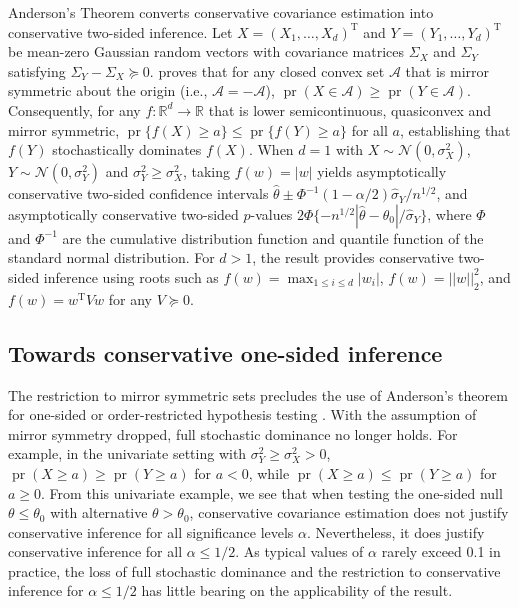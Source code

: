 \documentclass[11pt]{article}
\def\T{{ \mathrm{\scriptscriptstyle T} }}
\newcommand{\1}{\mathbbm{1}}
\def\pr{{\operatorname{pr}}}
\theoremstyle{plain}
\theoremstyle{definition}
\begin{document}
Anderson's Theorem \citep{and55} converts conservative covariance estimation into conservative two-sided inference. Let $X = (X_1,\ldots,X_d)^\T$ and $Y = (Y_1,\ldots,Y_d)^\T$ be mean-zero Gaussian random vectors with covariance matrices $\Sigma_X$ and $\Sigma_Y$ satisfying $\Sigma_Y-\Sigma_X \succeq 0$. \citet{and55} proves that for any closed convex set $\mathcal{A}$ that is mirror symmetric about the origin (i.e., $\mathcal{A}=-\mathcal{A}$), $\pr(X\in \mathcal{A})\geq \pr(Y\in \mathcal{A}).$ Consequently, for any $f: \mathbb{R}^d\rightarrow \mathbb{R}$ that is lower semicontinuous, quasiconvex and mirror symmetric, $\pr\{f(X)\geq a\} \leq \pr\{f(Y)\geq a\}$ for all $a$, establishing that $f(Y)$ stochastically dominates $f(X)$. When $d=1$ with $X\sim \mathcal{N}(0,\sigma^2_X)$, $Y\sim \mathcal{N}(0,\sigma^2_Y)$ and $\sigma^2_Y\geq \sigma^2_X$, taking $f(w) = |w|$ yields asymptotically conservative two-sided confidence intervals $\hat{\theta} \pm \Phi^{-1}(1-\alpha/2)\hat{\sigma}_Y/n^{1/2}$, and asymptotically conservative two-sided $p$-values $2\Phi\{-n^{1/2}|\hat{\theta}-\theta_0|/\hat{\sigma}_Y\}$, where $\Phi$ and $\Phi^{-1}$ are the cumulative distribution function and quantile function of the standard normal distribution. For $d > 1$, the result provides conservative two-sided inference using roots such as $f(w) = \max_{1\leq i \leq d}|w_i|$, $f(w) = ||w||^2_2$, and $f(w) = w^\T Vw$ for any $V \succeq 0$.
\subsection{Towards conservative one-sided inference}
The restriction to mirror symmetric sets precludes the use of Anderson's theorem for one-sided or order-restricted hypothesis testing \citep{sil05}. With the assumption of mirror symmetry dropped, full stochastic dominance no longer holds. For example, in the univariate setting with $\sigma^2_Y\geq \sigma^2_X>0$,  $\pr(X\geq a) \geq \pr(Y \geq a)$ for $a < 0$, while $\pr(X\geq a) \leq \pr(Y \geq a)$ for $a \geq 0$. From this univariate example, we see that when testing the one-sided null $\theta \leq \theta_0$ with alternative $\theta > \theta_0$, conservative covariance estimation does not justify conservative inference for all significance levels $\alpha$. Nevertheless, it {does} justify conservative inference for all $\alpha \leq 1/2$. As typical values of $\alpha$ rarely exceed 0.1 in practice, the loss of full stochastic dominance and the restriction to conservative inference for $\alpha \leq 1/2$ has little bearing on the applicability of the result.
\end{document}

